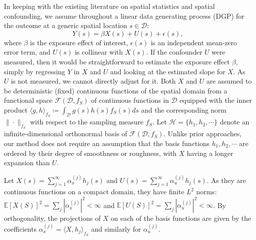\documentclass[
  12pt]{article}
\newcommand{\calD}{\mathcal{D}}
\newcommand{\calF}{\mathcal{F}}
\begin{document}
In keeping with the existing literature on spatial statistics and spatial confounding, we assume throughout a linear  data generating process (DGP) for the outcome at a generic spatial location $s \in \mathcal{D}$:
\begin{equation}\label{eq:dgp}
Y(s) = \beta X(s) + U(s) + \epsilon(s),
\end{equation}
where $\beta$ is the exposure effect of interest, $\epsilon(s)$ is an independent mean-zero error term, and $U(s)$ is collinear with $X(s)$. If the confounder $U$ were measured, then it would be straightforward to estimate the exposure effect $\beta$, simply by regressing $Y$ in $X$ and $U$ and looking at the estimated slope for $X$. As $U$ is not measured, we cannot directly adjust for it. 
Both $X$ and $U$ are assumed to be deterministic (fixed) continuous functions of the spatial domain from a functional space $\calF(\calD,f_S)$ of continuous functions in $\calD$ equipped with the inner product $\langle g,h\rangle_{f_S}\coloneqq \int_\calD g(s)h(s)f_S(s)ds$ and the corresponding norm $\|\cdot \|_{f_S}$ with respect to the sampling measure $f_S$. Let $\mathcal{H}=\{h_1,h_2, \cdots\}$ denote an infinite-dimensional orthonormal basis of $\calF(\mathcal{D}, f_S)$.  Unlike prior approaches, our method does not require an assumption that the basis functions $h_1,h_2, \cdots$ are ordered by their degree of smoothness or roughness, with $X$ having a longer expansion than $U$. 

Let $X(s) = \sum_{j=1}^\infty \alpha_{x}^{(j)} h_j(s)$ and $U(s) = \sum_{j=1}^\infty \alpha_{u}^{(j)} h_j(s)$. As they are continuous functions on a compact domain, they have finite $L^2$ norms: $\mathbb{E}[X(S)]^2 = \sum_j \left|\alpha_x^{(j)}\right|^2 < \infty$ and $\mathbb{E}[U(S)]^2 = \sum_j \left|\alpha_u^{(j)}\right|^2 < \infty$. By orthogonality, the projections of $X$ on each of the basis functions are given by the coefficients  $\alpha_x^{(j)} = \langle X, h_j\rangle_{f_{S}}$ and similarly for $\alpha_u^{(j)}$. 
\end{document}
